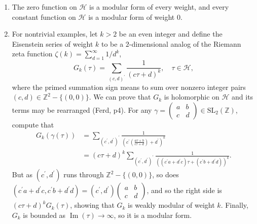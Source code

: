     \begin{example}\label{exp1}
        \begin{enumerate}
            \item The zero function on  $\mathcal{H}$  is a modular form of every weight, and every constant function on  $\mathcal{H}$  is a modular form of weight $0$.
            \item For nontrivial examples, let  $k>2$  be an even integer and define the Eisenstein series of weight  $k$  to be a $2$-dimensional analog of the Riemann zeta function  $\zeta(k)=\sum_{d=1}^{\infty} 1 / d^{k}$, 
            $$G_{k}(\tau)=\sum_{(c, d)^{\prime}} \frac{1}{(c \tau+d)^{k}}, \quad \tau \in \mathcal{H},$$
            where the primed summation sign means to sum over nonzero integer pairs  $(c, d) \in \mathbb{Z}^{2}-\{(0,0)\}$. We can prove that $G_{k}$  is holomorphic on  $\mathcal{H}$  and its terms may be rearranged (Ferd, p4). For any  $\gamma=\left(\begin{smallmatrix}a & b \\ c & d\end{smallmatrix}\right) \in \mathrm{SL}_{2}(\mathbb{Z})$, compute that    
            $$\begin{aligned}
            G_{k}(\gamma(\tau)) & =\sum_{\left(c^{\prime}, d^{\prime}\right)^{\prime}} \frac{1}{\left(c^{\prime}\left(\frac{a \tau+b}{c \tau+d}\right)+d^{\prime}\right)^{k}} \\
            & =(c \tau+d)^{k} \sum_{\left(c^{\prime}, d^{\prime}\right)^{\prime}}\frac{1}{\left(\left(c^{\prime} a+d^{\prime} c\right) \tau+\left(c^{\prime} b+d^{\prime} d\right)\right)^{k}}.
            \end{aligned}$$
            But as  $\left(c^{\prime}, d^{\prime}\right)$  runs through  $\mathbb{Z}^{2}-\{(0,0)\}$, so does  $\left(c^{\prime} a+d^{\prime} c, c^{\prime} b+d^{\prime} d\right)=   \left(c^{\prime}, d^{\prime}\right)\left(\begin{smallmatrix}a & b \\ c & d\end{smallmatrix}\right)$, and so the right side is  $(c \tau+d)^{k} G_{k}(\tau)$, showing that $ G_{k}$  is weakly modular of weight  $k$. Finally,  $G_{k}$  is bounded as  $\operatorname{Im}(\tau) \rightarrow \infty$, so it is a modular form.          
        \end{enumerate}
    \end{example}


